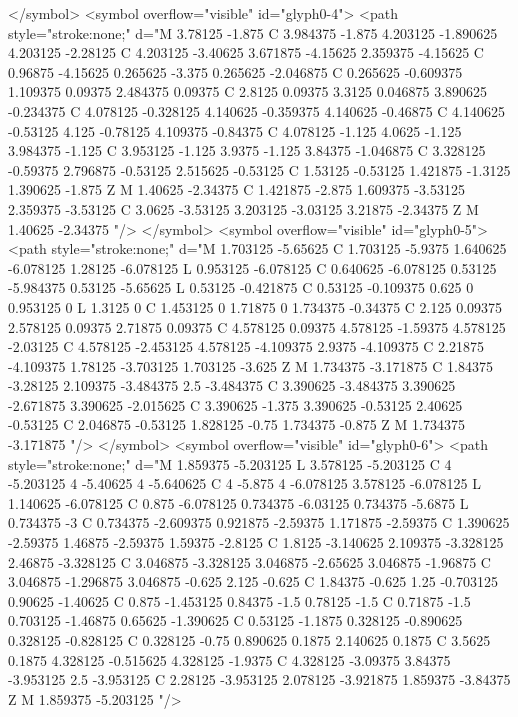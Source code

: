 </symbol>
<symbol overflow="visible" id="glyph0-4">
<path style="stroke:none;" d="M 3.78125 -1.875 C 3.984375 -1.875 4.203125 -1.890625 4.203125 -2.28125 C 4.203125 -3.40625 3.671875 -4.15625 2.359375 -4.15625 C 0.96875 -4.15625 0.265625 -3.375 0.265625 -2.046875 C 0.265625 -0.609375 1.109375 0.09375 2.484375 0.09375 C 2.8125 0.09375 3.3125 0.046875 3.890625 -0.234375 C 4.078125 -0.328125 4.140625 -0.359375 4.140625 -0.46875 C 4.140625 -0.53125 4.125 -0.78125 4.109375 -0.84375 C 4.078125 -1.125 4.0625 -1.125 3.984375 -1.125 C 3.953125 -1.125 3.9375 -1.125 3.84375 -1.046875 C 3.328125 -0.59375 2.796875 -0.53125 2.515625 -0.53125 C 1.53125 -0.53125 1.421875 -1.3125 1.390625 -1.875 Z M 1.40625 -2.34375 C 1.421875 -2.875 1.609375 -3.53125 2.359375 -3.53125 C 3.0625 -3.53125 3.203125 -3.03125 3.21875 -2.34375 Z M 1.40625 -2.34375 "/>
</symbol>
<symbol overflow="visible" id="glyph0-5">
<path style="stroke:none;" d="M 1.703125 -5.65625 C 1.703125 -5.9375 1.640625 -6.078125 1.28125 -6.078125 L 0.953125 -6.078125 C 0.640625 -6.078125 0.53125 -5.984375 0.53125 -5.65625 L 0.53125 -0.421875 C 0.53125 -0.109375 0.625 0 0.953125 0 L 1.3125 0 C 1.453125 0 1.71875 0 1.734375 -0.34375 C 2.125 0.09375 2.578125 0.09375 2.71875 0.09375 C 4.578125 0.09375 4.578125 -1.59375 4.578125 -2.03125 C 4.578125 -2.453125 4.578125 -4.109375 2.9375 -4.109375 C 2.21875 -4.109375 1.78125 -3.703125 1.703125 -3.625 Z M 1.734375 -3.171875 C 1.84375 -3.28125 2.109375 -3.484375 2.5 -3.484375 C 3.390625 -3.484375 3.390625 -2.671875 3.390625 -2.015625 C 3.390625 -1.375 3.390625 -0.53125 2.40625 -0.53125 C 2.046875 -0.53125 1.828125 -0.75 1.734375 -0.875 Z M 1.734375 -3.171875 "/>
</symbol>
<symbol overflow="visible" id="glyph0-6">
<path style="stroke:none;" d="M 1.859375 -5.203125 L 3.578125 -5.203125 C 4 -5.203125 4 -5.40625 4 -5.640625 C 4 -5.875 4 -6.078125 3.578125 -6.078125 L 1.140625 -6.078125 C 0.875 -6.078125 0.734375 -6.03125 0.734375 -5.6875 L 0.734375 -3 C 0.734375 -2.609375 0.921875 -2.59375 1.171875 -2.59375 C 1.390625 -2.59375 1.46875 -2.59375 1.59375 -2.8125 C 1.8125 -3.140625 2.109375 -3.328125 2.46875 -3.328125 C 3.046875 -3.328125 3.046875 -2.65625 3.046875 -1.96875 C 3.046875 -1.296875 3.046875 -0.625 2.125 -0.625 C 1.84375 -0.625 1.25 -0.703125 0.90625 -1.40625 C 0.875 -1.453125 0.84375 -1.5 0.78125 -1.5 C 0.71875 -1.5 0.703125 -1.46875 0.65625 -1.390625 C 0.53125 -1.1875 0.328125 -0.890625 0.328125 -0.828125 C 0.328125 -0.75 0.890625 0.1875 2.140625 0.1875 C 3.5625 0.1875 4.328125 -0.515625 4.328125 -1.9375 C 4.328125 -3.09375 3.84375 -3.953125 2.5 -3.953125 C 2.28125 -3.953125 2.078125 -3.921875 1.859375 -3.84375 Z M 1.859375 -5.203125 "/>
